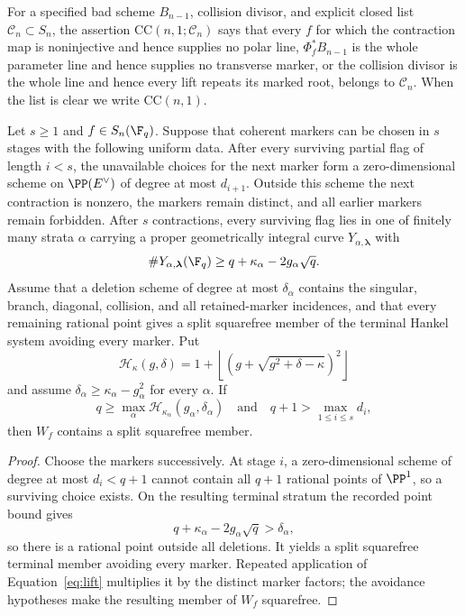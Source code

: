 \begin{definition}
\label{def:contained}
For a specified bad scheme \(B_{n-1}\), collision divisor, and explicit
closed list \(\mathcal C_n\subset S_n\), the assertion
\(\mathrm{CC}(n,1;\mathcal C_n)\) says that every \(f\) for which the
contraction map is noninjective and hence supplies no polar line,
\(\Phi_f^*B_{n-1}\) is the whole parameter line and hence supplies no
transverse marker, or the collision divisor is the whole line and
hence every lift repeats its marked root, belongs to \(\mathcal C_n\).
When the list is clear we write
\(\mathrm{CC}(n,1)\).
\end{definition}


\begin{theorem}\label{supp:thm:induction}%
%
%
Let \(s\geq1\) and \(f\in S_n(\F_q)\).  Suppose that coherent markers
can be chosen in \(s\) stages with the following uniform data.
After every surviving partial flag of length \(i<s\), the unavailable
choices for the next marker form a zero-dimensional scheme on
\(\PP(E^\vee)\) of degree at most \(d_{i+1}\).  Outside this scheme
the next contraction is nonzero, the markers remain distinct, and all
earlier markers remain forbidden.  After \(s\) contractions, every
surviving flag lies in one of finitely many strata \(\alpha\) carrying
a proper geometrically integral curve \(Y_{\alpha,\boldsymbol\lambda}\) with
\[
 \#Y_{\alpha,\boldsymbol\lambda}(\F_q)\geq
 q+\kappa_\alpha-2g_\alpha\sqrt q .
\]
Assume that a deletion scheme of degree at most \(\delta_\alpha\)
contains the singular, branch, diagonal, collision, and all
retained-marker incidences, and that every remaining rational point gives a
split squarefree member of the terminal Hankel system avoiding every
marker.  Put
\[
\mathcal H_\kappa(g,\delta)=
1+\left\lfloor
\left(g+\sqrt{g^2+\delta-\kappa}\right)^2
\right\rfloor
\]
and assume
\(\delta_\alpha\geq\kappa_\alpha-g_\alpha^2\) for every \(\alpha\).
If
\[
q\geq \max_\alpha
\mathcal H_{\kappa_\alpha}(g_\alpha,\delta_\alpha)
\quad\text{and}\quad
q+1>\max_{1\leq i\leq s}d_i,
\]
then \(W_f\) contains a split squarefree member.
\end{theorem}

\begin{proof}
Choose the markers successively.  At stage \(i\), a zero-dimensional
scheme of degree at most \(d_i<q+1\) cannot contain all
\(q+1\) rational points of \(\PP^1\), so a surviving choice exists.
On the resulting terminal stratum the recorded point bound
gives
\[
 q+\kappa_\alpha-2g_\alpha\sqrt q>\delta_\alpha,
\]
so there is a rational point outside all deletions.  It yields a split
squarefree terminal member avoiding every marker.  Repeated application
of Equation~\eqref{eq:lift} multiplies it by the distinct marker factors;
the avoidance hypotheses make the resulting member of \(W_f\)
squarefree.
\end{proof}

